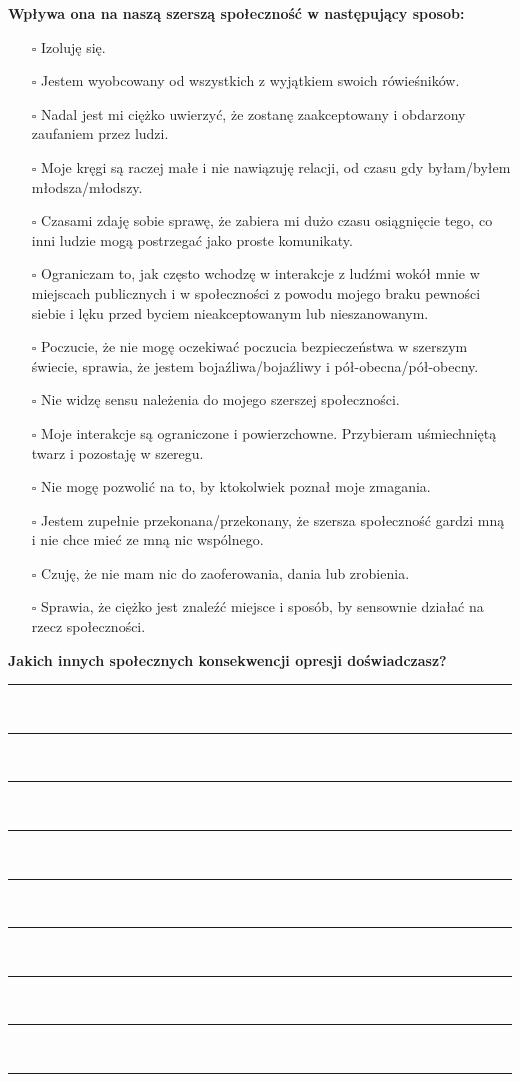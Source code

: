 \newpage
\noindent
\textbf{\large{Wpływa ona na naszą szerszą społeczność w następujący sposob:}}
\begin{multicols}{2}
\begin{itemize}
\item[$\square$]{Izoluję się.}
\item[$\square$]{Jestem wyobcowany od wszystkich z wyjątkiem swoich rówieśników.}
\item[$\square$]{Nadal jest mi ciężko uwierzyć, że zostanę zaakceptowany i obdarzony zaufaniem przez ludzi.}
\item[$\square$]{Moje kręgi są raczej małe i nie nawiązuję relacji, od czasu gdy byłam/byłem młodsza/młodszy.}
\item[$\square$]{Czasami zdaję sobie sprawę, że zabiera mi dużo czasu osiągnięcie tego, co inni ludzie mogą postrzegać jako proste komunikaty.}
\item[$\square$]{Ograniczam to, jak często wchodzę w interakcje z ludźmi wokół mnie w miejscach publicznych i w społeczności z powodu mojego braku pewności siebie i lęku przed byciem nieakceptowanym lub nieszanowanym.}
\item[$\square$]{Poczucie, że nie mogę oczekiwać poczucia bezpieczeństwa w szerszym świecie, sprawia, że jestem bojaźliwa/bojaźliwy i pół-obecna/pół-obecny.}
\item[$\square$]{Nie widzę sensu należenia do mojego szerszej społeczności.}
\item[$\square$]{Moje interakcje są ograniczone i powierzchowne. Przybieram uśmiechniętą twarz i pozostaję w szeregu.}
\item[$\square$]{Nie mogę pozwolić na to, by ktokolwiek poznał moje zmagania.}
\item[$\square$]{Jestem zupełnie przekonana/przekonany, że szersza społeczność gardzi mną i nie chce mieć ze mną nic wspólnego.}
\item[$\square$]{Czuję, że nie mam nic do zaoferowania, dania lub zrobienia.}
\item[$\square$]{Sprawia, że ciężko jest znaleźć miejsce i sposób, by sensownie działać na rzecz społeczności.}
\end{itemize}
\end{multicols}

\noindent
\textcolor{ProcessBlue}{\textbf{\Large{Jakich innych społecznych konsekwencji opresji doświadczasz?}}}\\
\noindent\rule{\textwidth}{1pt}\\
\noindent\rule{\textwidth}{1pt}\\
\noindent\rule{\textwidth}{1pt}\\
\noindent\rule{\textwidth}{1pt}\\
\noindent\rule{\textwidth}{1pt}\\
\noindent\rule{\textwidth}{1pt}\\
\noindent\rule{\textwidth}{1pt}\\
\noindent\rule{\textwidth}{1pt}\\
\noindent\rule{\textwidth}{1pt}\\\\


